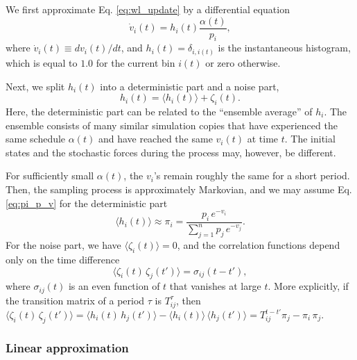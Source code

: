 \documentclass[reprint]{revtex4-1}
\begin{document}
We first approximate Eq. \eqref{eq:wl_update}
by a differential equation
%
\begin{equation}
  \dot v_i(t)
  =
  h_i(t) \frac{ \alpha(t) } { p_i },
  \label{eq:vt_diffeq}
\end{equation}
%
where
$\dot v_i(t) \equiv dv_i(t)/dt$,
%
and $h_i(t) = \delta_{i, i(t)}$
is the instantaneous histogram,
which is equal to $1.0$
for the current bin $i(t)$
or zero otherwise.



Next, we split $h_i(t)$ into a deterministic part
and a noise part,
%
\begin{equation}
  h_i(t) = \langle h_i(t) \rangle + \zeta_i(t).
  \label{eq:h_split}
\end{equation}
%
Here, the deterministic part can be related
to the ``ensemble average'' of $h_i$.
%
The ensemble consists of many similar simulation copies
that have experienced the same schedule $\alpha(t)$
and have reached the same $v_i(t)$
at time $t$.
%
The initial states and the stochastic forces
during the process may, however, be different.



For sufficiently small $\alpha(t)$,
the $v_i$'s remain roughly the same for a short period.
%
Then,
the sampling process is approximately Markovian, %
and we may assume Eq. \eqref{eq:pi_p_v}
for the deterministic part
%
\begin{equation}
  \langle h_i(t) \rangle
  \approx
  \pi_i
  =
  \frac{ p_i \, e^{-v_i} }
  { \sum_{j = 1}^n p_j \, e^{-v_j} }.
  \label{eq:h_ave}
\end{equation}
%
%
%
For the noise part, we have
$\langle \zeta_i(t) \rangle = 0$,
%
and the correlation functions
depend only on the time difference
%
\begin{equation}
  \langle \zeta_i(t) \, \zeta_j(t') \rangle
  =
  \sigma_{ij}(t - t'),
  \label{eq:zeta_zeta_correlation}
\end{equation}
%
where $\sigma_{ij}(t)$ is an even function of $t$
that vanishes at large $t$.
%
More explicitly,
if the transition matrix of a period $\tau$
is $T^\tau_{ij}$,
then
$
  \langle \zeta_i(t) \, \zeta_j(t') \rangle
  =
  \langle h_i(t) \, h_j(t') \rangle
  -
  \langle h_i(t) \rangle \, \langle h_j(t') \rangle
  =
  T^{t - t'}_{ij} \pi_j - \pi_i \, \pi_j.
$




\subsubsection{Linear approximation}
\end{document}
